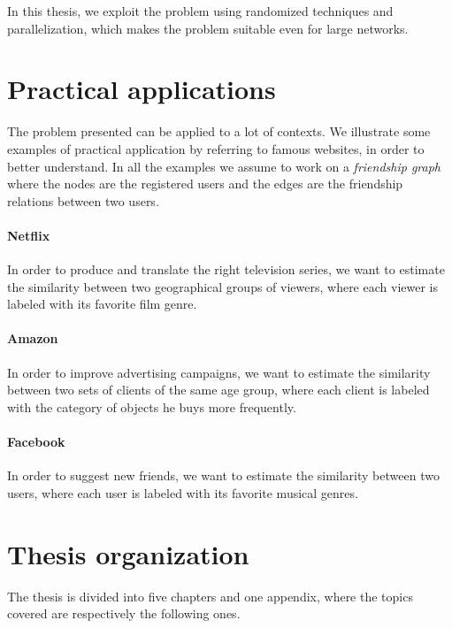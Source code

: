 In this thesis, we exploit the problem using randomized techniques and parallelization, which makes the problem suitable even for large networks. 

\section{Practical applications}

The problem presented can be applied to a lot of contexts. 
We illustrate some examples of practical application by referring to famous websites,
in order to better understand.
In all the examples we assume to work on a \textit{friendship graph} where the nodes are the registered users and 
the edges are the friendship relations between two users.

\paragraph*{Netflix} In order to produce and translate the right television series, we want to estimate the similarity between two geographical groups of viewers, where each viewer is labeled with its favorite film genre.

\paragraph*{Amazon} In order to improve advertising campaigns, we want to estimate the similarity between two sets of clients of the same age group, where each client is labeled with the category of objects he buys more frequently.

\paragraph*{Facebook} In order to suggest new friends, we want to estimate the similarity between two users, where each user is labeled with its favorite musical genres.  

\section{Thesis organization}

The thesis is divided into five chapters and one appendix, where
the topics covered are respectively the following ones.

